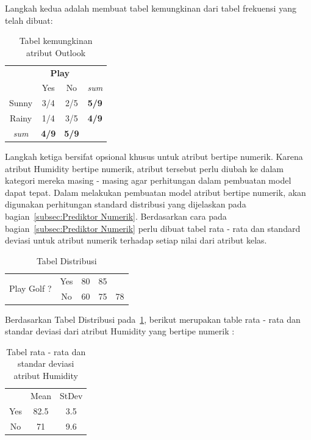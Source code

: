Langkah kedua adalah membuat tabel kemungkinan dari tabel frekuensi yang telah dibuat:		
\begin{table}[ht]
	\centering
	\caption{Tabel kemungkinan atribut Outlook}
	\begin{tabular}{|c|c|c|c|}
	\toprule
	& \multicolumn{2}{c}{\textbf{Play}} & \\
	& Yes & No & \textit{sum} \\ 
	\midrule
	Sunny & 3/4 & 2/5 & \textbf{5/9}\\
	\midrule
	Rainy & 1/4 & 3/5 & \textbf{4/9} \\
	\midrule
	\textit{sum} & \textbf{4/9} & \textbf{5/9} & \\
	\bottomrule
	\end{tabular}
\end{table}

Langkah ketiga bersifat opsional khusus untuk atribut bertipe numerik. Karena atribut Humidity bertipe numerik, atribut tersebut perlu diubah ke dalam kategori mereka masing - masing agar perhitungan dalam pembuatan model dapat tepat. Dalam melakukan pembuatan model atribut bertipe numerik, akan digunakan perhitungan standard distribusi yang dijelaskan pada bagian~\ref{subsec:Prediktor Numerik}. Berdasarkan cara pada bagian~\ref{subsec:Prediktor Numerik} perlu dibuat tabel rata - rata dan standard deviasi untuk atribut numerik terhadap setiap nilai dari atribut kelas.

		\begin{table}[H]
		\centering
		\caption{Tabel Distribusi}
		\label{tab:Table Distribusi-2}
		\begin{tabular}{|c|c|c|c|c|}
		\toprule
		\multirow{2}{*}{Play Golf ?} & Yes & 80 & 85 & \\
		 & No & 60 & 75 & 78 \\
		\bottomrule
		\end{tabular}
		\end{table}
		
		Berdasarkan Tabel Distribusi pada~\ref{tab:Table Distribusi-2}, berikut merupakan table rata - rata dan standar deviasi dari atribut Humidity yang bertipe numerik : 
		
		\begin{table}[H]
		\centering
		\caption{Tabel rata - rata dan standar deviasi atribut Humidity}
		\begin{tabular}{|c|c|c|}
		\toprule
		 & Mean & StDev \\
		Yes & 82.5 & 3.5 \\
		No & 71 & 9.6 \\
		\bottomrule
		\end{tabular}
		\end{table}



